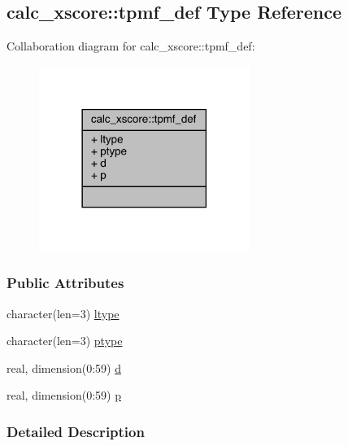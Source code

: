 \hypertarget{structcalc__xscore_1_1tpmf__def}{\subsection{calc\-\_\-xscore\-:\-:tpmf\-\_\-def Type Reference}
\label{structcalc__xscore_1_1tpmf__def}
}


Collaboration diagram for calc\-\_\-xscore\-:\-:tpmf\-\_\-def\-:
\nopagebreak
\begin{figure}[H]
\begin{center}
\leavevmode
\includegraphics[width=194pt]{structcalc__xscore_1_1tpmf__def__coll__graph}
\end{center}
\end{figure}
\subsubsection*{Public Attributes}
\begin{DoxyCompactItemize}
\item 
character(len=3) \hyperlink{structcalc__xscore_1_1tpmf__def_ac2aedd69b07025b6d933984e96ce593c}{ltype}
\item 
character(len=3) \hyperlink{structcalc__xscore_1_1tpmf__def_ade3e5130d761ea8ac17b7e374264efb9}{ptype}
\item 
real, dimension(0\-:59) \hyperlink{structcalc__xscore_1_1tpmf__def_ad96f8e834af4cb7fdbda1731d0723a2e}{d}
\item 
real, dimension(0\-:59) \hyperlink{structcalc__xscore_1_1tpmf__def_a8af3c25992eb0e49bed131e89a57beb4}{p}
\end{DoxyCompactItemize}


\subsubsection{Detailed Description}


